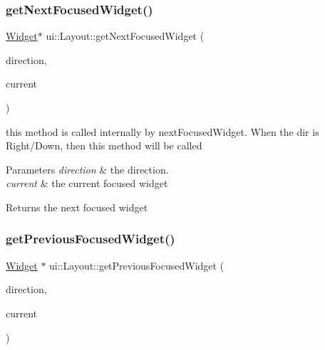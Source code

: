 \subsubsection{\texorpdfstring{get\+Next\+Focused\+Widget()}{getNextFocusedWidget()}\hspace{0.1cm}{\footnotesize\ttfamily [2/2]}}
{\footnotesize\ttfamily \hyperlink{classui_1_1Widget}{Widget}$\ast$ ui\+::\+Layout\+::get\+Next\+Focused\+Widget (\begin{DoxyParamCaption}\item[{\hyperlink{classui_1_1Widget_a8ae8e8fc793a04a87584205cd1e8a8a5}{Focus\+Direction}}]{direction,  }\item[{\hyperlink{classui_1_1Widget}{Widget} $\ast$}]{current }\end{DoxyParamCaption})\hspace{0.3cm}{\ttfamily [protected]}}

this method is called internally by next\+Focused\+Widget. When the dir is Right/\+Down, then this method will be called 
\begin{DoxyParams}{Parameters}
{\em direction} & the direction. \\
\hline
{\em current} & the current focused widget \\
\hline
\end{DoxyParams}
\begin{DoxyReturn}{Returns}
the next focused widget 
\end{DoxyReturn}
\mbox{\label{classui_1_1Layout_aef63ee3e6623dd6c7cbde8e8ee19c5c1}} 
\subsubsection{\texorpdfstring{get\+Previous\+Focused\+Widget()}{getPreviousFocusedWidget()}\hspace{0.1cm}{\footnotesize\ttfamily [1/2]}}
{\footnotesize\ttfamily \hyperlink{classui_1_1Widget}{Widget} $\ast$ ui\+::\+Layout\+::get\+Previous\+Focused\+Widget (\begin{DoxyParamCaption}\item[{\hyperlink{classui_1_1Widget_a8ae8e8fc793a04a87584205cd1e8a8a5}{Focus\+Direction}}]{direction,  }\item[{\hyperlink{classui_1_1Widget}{Widget} $\ast$}]{current }\end{DoxyParamCaption})\hspace{0.3cm}{\ttfamily [protected]}}

